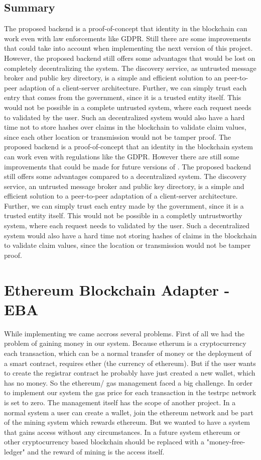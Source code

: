 \subsection{Summary}
The proposed backend is a proof-of-concept that identity in the blockchain can work even with law enforcements like GDPR.
Still there are some improvements that could take into account when implementing the next version of this project.
However, the proposed backend still offers some advantages that would be lost on completely decentralizing the system.
The discovery service, as untrusted message broker and public key directory,
is a simple and efficient solution to an peer-to-peer adaption of a client-server architecture.
Further, we can simply trust each entry that comes from the government, since it is a trusted entity itself.
This would not be possible in a complete untrusted system, where each request needs to validated by the user.
Such an decentralized system would also have a hard time not to store hashes over claims in the blockchain to validate
claim values, since each other location or transmission would not be tamper proof.
The proposed backend is a proof-of-concept that an identity in the blockchain system can work even with regulations like the GDPR. However there are still some improvements that could be made for future versions of \projectName{}. The proposed backend still offers some advantages compared to a decentralized system. The discovery service, an untrusted message broker and public key directory, is a simple and efficient solution to a peer-to-peer adaptation of a client-server architecture. Further, we can simply trust each entry made by the government, since it is a trusted entity itself. This would not be possible in a completly untrustworthy system, where each request needs to validated by the user. Such a decentralized system would also have a hard time not storing hashes of claims in the blockchain to validate claim values, since the location or transmission would not be tamper proof.

\section{Ethereum Blockchain Adapter - EBA}
\label{sec:ethereumBlockchainAdapterEval}

While implementing we came accross several problems.
First of all we had the problem of gaining money in our system. Because etherum is a cryptocurrency each transaction, which can be a normal transfer of money or the deployment of a smart contract, requires ether (the currency of ethereum). But if the user wants to create the registrar contract he probably have just created a new wallet, which has no money. So the ethereum/ gas management faced a big challenge. In order to implement our system the gas price for each transaction in the testrpc network is set to zero. The management itself has the scope of another project.
In a normal system a user can create a wallet, join the ethereum network and be part of the mining system which rewards ethereum. But we wanted to have a system that gains access without any circumstances. In a future system ethereum or other cryptocurrency based blockchain should be replaced with a "money-free-ledger" and the reward of mining is the access itself.

